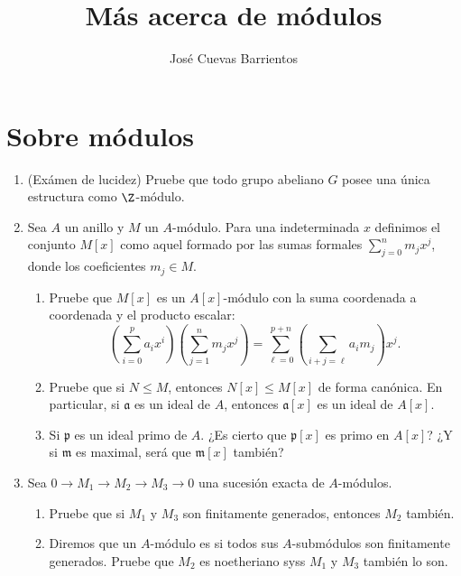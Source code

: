 \documentclass[11pt, reqno]{amsart}
\title{Más acerca de módulos}
\date{\DTMdate{2025-05-22}}
\author{José Cuevas Barrientos}
\begin{document}
\maketitle

\nocite{atiyah:commutative}

\section{Sobre módulos}
\begin{enumerate}
	\item\lookright
		(Exámen de lucidez)
		Pruebe que todo grupo abeliano $G$ posee una única estructura como $\Z$-módulo.
	\item Sea $A$ un anillo y $M$ un $A$-módulo.
		Para una indeterminada $x$ definimos el conjunto $M[x]$ como aquel formado por las sumas formales
		$\sum_{j=0}^{n} m_jx^j$, donde los coeficientes $m_j \in M$.
		\begin{enumerate}
			\item Pruebe que $M[x]$ es un $A[x]$-módulo con la suma coordenada a coordenada y el producto
				escalar:
				\[
					\left( \sum_{i=0}^{p} a_ix^i \right)\left( \sum_{j=1}^{n} m_jx^j \right) =
					\sum_{\ell=0}^{p+n} \left( \sum_{i+j=\ell} a_im_j \right) x^j.
				\]
			\item Pruebe que si $N \le M$, entonces $N[x] \le M[x]$ de forma canónica.
				En particular, si $\mathfrak{a}$ es un ideal de $A$, entonces $\mathfrak{a}[x]$ es un
				ideal de $A[x]$.
			\item\lookright
				Si $\mathfrak{p}$ es un ideal primo de $A$.
				¿Es cierto que $\mathfrak{p}[x]$ es primo en $A[x]$?
				¿Y si $\mathfrak{m}$ es maximal, será que $\mathfrak{m}[x]$ también?
		\end{enumerate}

	\item Sea $0 \to M_1 \to M_2 \to M_3 \to 0$ una sucesión exacta de $A$-módulos.
		\begin{enumerate}
			\item Pruebe que si $M_1$ y $M_3$ son finitamente generados, entonces $M_2$ también.
			\item Diremos que un $A$-módulo es  si todos sus $A$-submódulos son finitamente generados.
				Pruebe que $M_2$ es noetheriano syss $M_1$ y $M_3$ también lo son.
		\end{enumerate}


\end{enumerate}
\end{document}

